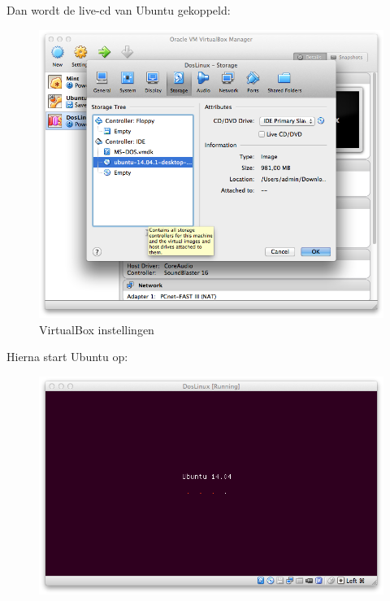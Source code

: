 \documentclass[11pt, a4paper]{article}
\begin{document}
Dan wordt de live-cd van Ubuntu gekoppeld: 

\begin{figure}[H]
	\centering
	\includegraphics[width=\textwidth]{./IMG/C}
	\caption{VirtualBox instellingen}
\end{figure}

Hierna start Ubuntu op:

\begin{figure}[H]
	\centering
	\includegraphics[width=\textwidth]{./IMG/D}
\end{figure}
\end{document}
